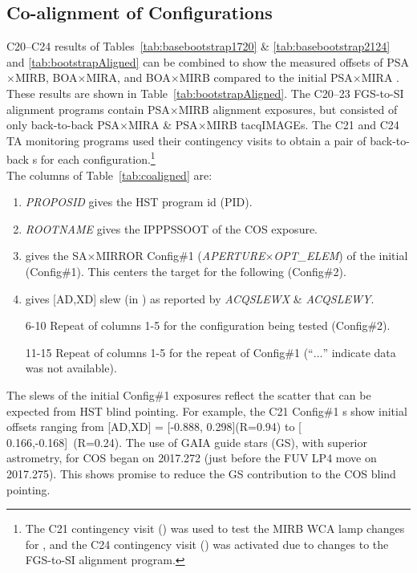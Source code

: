 

\subsection{Co-alignment of  Configurations \label{subsec:NIMsummary}}
C20--C24 results of Tables~\ref{tab:basebootstrap1720} \& \ref{tab:basebootstrap2124} and \ref{tab:bootstrapAligned} can be combined to show the measured offsets of PSA$\times$MIRB, BOA$\times$MIRA, and BOA$\times$MIRB compared to the initial PSA$\times$MIRA .
These results are shown in Table~\ref{tab:bootstrapAligned}. The C20--23 FGS-to-SI alignment programs contain PSA$\times$MIRB alignment exposures, but consisted of only back-to-back PSA$\times$MIRA \& PSA$\times$MIRB tacq{IMAGE}s.
The C21 and C24 TA monitoring programs used their contingency visits to obtain a pair of back-to-back s for each configuration.\footnote{The C21 contingency visit () was used to test the MIRB WCA lamp changes for ,
and the C24 contingency visit () was activated due to changes to the FGS-to-SI alignment program.}\\

The columns of Table~\ref{tab:coaligned} are:
\footnotesize
\begin{enumerate}
\item \textit{PROPOSID} gives the HST program id (PID).
\item \textit{ROOTNAME} gives the IPPPSSOOT of the COS exposure.
\item gives the SA$\times$MIRROR Config\#1 (\textit{APERTURE}$\times$\textit{OPT\_ELEM}) of the initial  (Config\#1).
This  centers the target for the following  (Config\#2).
\item gives  [AD,XD] slew (in \arcsec) as reported by \textit{ACQSLEWX} \& \textit{ACQSLEWY}.
\item[6-10] Repeat of columns 1-5 for the configuration being tested (Config\#2).
\item[11-15] Repeat of columns 1-5 for the repeat of Config\#1 (``$\dots$'' indicate data was not available).
\end{enumerate}
\normalsize

The  slews of the initial Config\#1 exposures reflect the scatter that can be expected from HST blind pointing.
For example, the C21 Config\#1 s show initial offsets ranging from [AD,XD] = [-0.888, 0.298]\arcsec{}(R=0.94\arcsec)
to [ 0.166,-0.168]\arcsec~(R=0.24\arcsec). The use of GAIA guide stars (GS), with superior astrometry, for COS began on 2017.272 (just before
the FUV LP4 move on 2017.275). This shows promise to reduce the GS contribution to the COS blind pointing.


